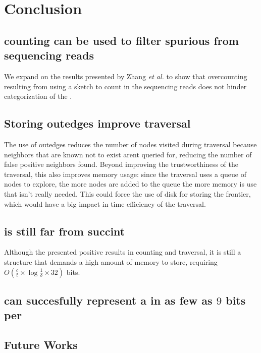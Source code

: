 \chapter{Conclusion}

\section{ \kmer counting can be used to filter spurious  from sequencing reads}

We expand on the results presented by Zhang \emph{et al.} to show that overcounting resulting from using a \cm sketch to count  in the sequencing reads does not hinder categorization of the .

\section{Storing outedges improve traversal}

The use of outedges reduces the number of nodes visited during traversal because neighbors that are known not to exist arent queried for, reducing the number of false positive neighbors found. Beyond improving the trustworthiness of the traversal, this also improves memory usage: since the traversal uses a queue of nodes to explore, the more nodes are added to the queue the more memory is use that isn't really needed. This could force the use of disk for storing the frontier, which would have a big impact in time efficiency of the traversal.

\section{\dBCM is still far from succint}

Although the \dBCM presented positive results in counting and traversal, it is still a structure that demands a high amount of memory to store, requiring $O(\frac{c}{t} \times \log \frac{1}{\delta} \times 32)$ bits.

\section{\dBHT can succesfully represent a \dBG in as few as $9$ bits per \kmer}

\section{Future Works}

